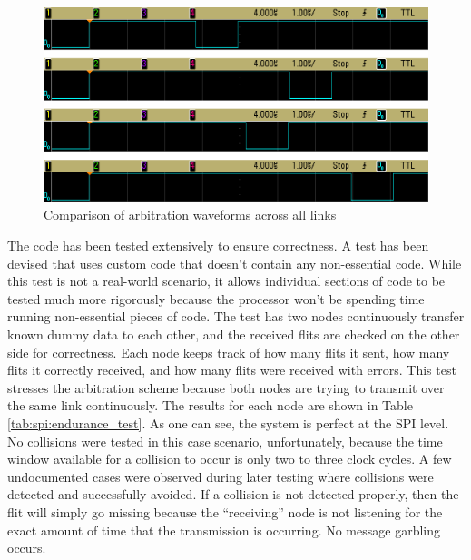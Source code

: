 \begin{landscape}
	\begin{figure}[p]
		\begin{centering}
			\includegraphics[width=8.5in]{SPI/Figures/spi-waveform_comparison.png}
			\caption{Comparison of arbitration waveforms across all links}
			\label{fig:spi:waveform_comparison}
		\end{centering}
	\end{figure}
\end{landscape}

The code has been tested extensively to ensure correctness. A test has been devised that uses custom code that doesn't contain any non-essential code. While this test is not a real-world scenario, it allows individual sections of code to be tested much more rigorously because the processor won't be spending time running non-essential pieces of code. The test has two nodes continuously transfer known dummy data to each other, and the received flits are checked on the other side for correctness. Each node keeps track of how many flits it sent, how many flits it correctly received, and how many flits were received with errors. This test stresses the arbitration scheme because both nodes are trying to transmit over the same link continuously. The results for each node are shown in Table \ref{tab:spi:endurance_test}. As one can see, the system is perfect at the SPI level. No collisions were tested in this case scenario, unfortunately, because the time window available for a collision to occur is only two to three clock cycles. A few undocumented cases were observed during later testing where collisions were detected and successfully avoided. If a collision is not detected properly, then the flit will simply go missing because the ``receiving'' node is not listening for the exact amount of time that the transmission is occurring. No message garbling occurs.

